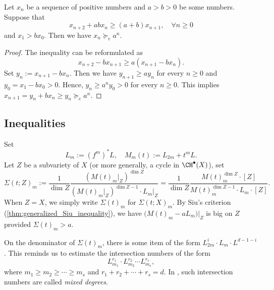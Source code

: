 

\begin{lemma}\label{lemma:recursive_inequality_implies_exponential_growth}
	Let $x_n$ be a sequence of positive numbers and $a>b>0$ be some numbers.
	Suppose that
	\[ x_{n+2} + ab x_n \geq (a+b) x_{n+1}, \quad \forall n \geq 0 \]
	and $x_1 > b x_0$.
	Then we have $x_n \succcurlyeq_e a^n$.
\end{lemma}
\begin{proof}
	The inequality can be reformulated as
	\[ x_{n+2} - b x_{n+1} \geq a (x_{n+1} - b x_n). \]
	Set $y_n := x_{n+1} - b x_n$.
	Then we have $y_{n+1} \geq a y_n$ for every $n \geq 0$ and $y_0 = x_1 - b x_0 > 0$.
	Hence, $y_n \geq a^n y_0 > 0$ for every $n \geq 0$.
	This implies $x_{n+1} = y_n + b x_n \geq y_n \succcurlyeq_e a^n$.
\end{proof}


\subsection{Inequalities}


Set
\[ L_m := (f^m)^* L, \quad M_m(t) := L_{2m} + t^m L. \]
Let $Z$ be a subvariety of $X$ (or more generally, a cycle in $\CH^\bullet(X)$),  set
\[ \Sigma(t;Z)_m := \frac{1}{\dim Z} \frac{\left(M(t)_m|_Z\right)^{\dim Z}}{\left(M(t)_m|_Z\right)^{\dim Z - 1} \cdot L_m|_Z} = \frac{1}{\dim Z} \frac{M(t)_m^{\dim Z} \cdot [Z]}{M(t)_m^{\dim Z - 1} \cdot L_m \cdot [Z]}. \]
When $Z = X$, we simply write $\Sigma(t)_m$ for $\Sigma(t;X)_m$.
By Siu's criterion (\cref{thm:generalized_Siu_inequality}), we have $\bigl(M(t)_m - a L_m\bigr)|_Z$ is big on $Z$ provided $\Sigma(t)_m > a$.

On the denominator of $\Sigma(t)_m$, there is some item of the form $L_{2m}^i \cdot L_m \cdot L^{d-1-i}$.
This reminds us to estimate the intersection numbers of the form
\[ L_{m_1}^{r_1} \cdot L_{m_2}^{r_2} \cdots L_{m_s}^{r_s}, \]
where $m_1 \geq m_2 \geq \cdots \geq m_s$ and $r_1 + r_2 + \cdots + r_s = d$.
In \cite{Xie24recursive_inequalities}, such intersection numbers are called \emph{mixed degrees}.

